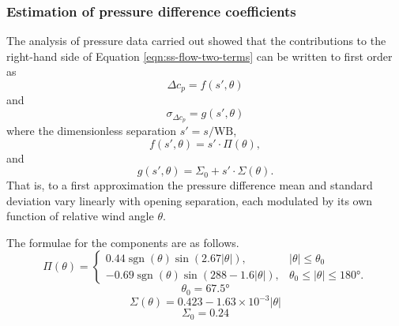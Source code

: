 \subsubsection{Estimation of pressure difference coefficients}
The analysis of pressure data carried out showed that the contributions to the
right-hand side of Equation \ref{eqn:ss-flow-two-terms} can be written to first order
as
\begin{equation}
\Delta c_p=f(s',\theta)
\end{equation}
and
\begin{equation}
\sigma_{\Delta c_p}=g(s',\theta)
\end{equation}
where the dimensionless separation $s' = s/\textrm{WB}$,
\begin{equation}
f(s',\theta)=s'\cdot\Pi(\theta),
\end{equation}
and
\begin{equation}
g(s',\theta)=\Sigma_0+s'\cdot\Sigma(\theta).
\end{equation}
That is, to a first approximation the pressure difference mean and standard deviation vary linearly with opening separation, each modulated by its own function of relative wind angle $\theta$.

The formulae for the components are as follows.
\begin{equation}\label{eqn:ss-first-formula}
\Pi(\theta) =
\begin{cases}
0.44\operatorname{sgn}(\theta)\sin(2.67|\theta|),& |\theta| \leq \theta_0 \\
-0.69 \operatorname{sgn}(\theta)\sin(288-1.6|\theta|),& \theta_0\leq|\theta|\leq\ang{180}.
\end{cases}
\end{equation}
\begin{equation}\label{eqn:ss-second-formula}
\theta_0 = \ang{67.5}
\end{equation}
\begin{equation}\label{eqn:ss-third-formula}
\Sigma(\theta) = 0.423 - 1.63\times 10^{-3}|\theta|
\end{equation}
\begin{equation}\label{eqn:ss-last-formula}
\Sigma_0=0.24
\end{equation}

